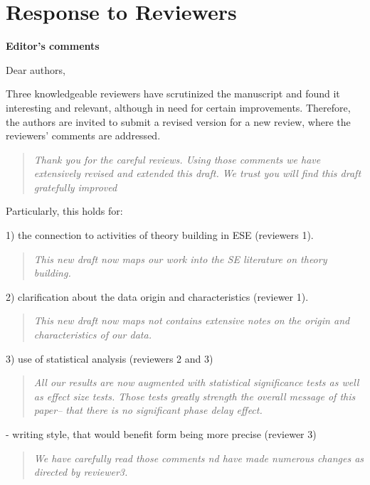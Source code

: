  \section*{Response to Reviewers}

 
{\bf Editor's comments}
 
Dear authors,

Three knowledgeable reviewers have scrutinized the manuscript
and found it interesting and relevant,  although in need for
certain improvements. Therefore, the authors are
 invited to submit a revised version for a new review, where
 the reviewers' comments
are addressed.

\begin{quote} {\em Thank you for the careful reviews. Using
those comments we have extensively revised and extended this draft.
We trust you will find this draft gratefully improved}
\end{quote}

Particularly, this holds for:


1) the connection to activities of theory building in ESE
(reviewers 1).  


 

\begin{quote}{\em This new draft  now maps our work into the SE literature on theory building.}\end{quote}
 
2) clarification about the data origin and
characteristics (reviewer 1). 
 

\begin{quote}{\em
This new draft  now maps not contains extensive notes on the origin and characteristics of our data.}\end{quote}

3)  use of statistical analysis (reviewers 2 and 3) 


\begin{quote}{\em All our results are now augmented with statistical significance tests as well as effect size tests. Those tests greatly strength the overall message of this paper-- that there is no significant
phase delay effect.}\end{quote}

 
- writing style, that would benefit form being more
precise (reviewer 3)

\begin{quote}{\em We have carefully read those comments  nd have made numerous changes
as directed by reviewer3.}\end{quote}

